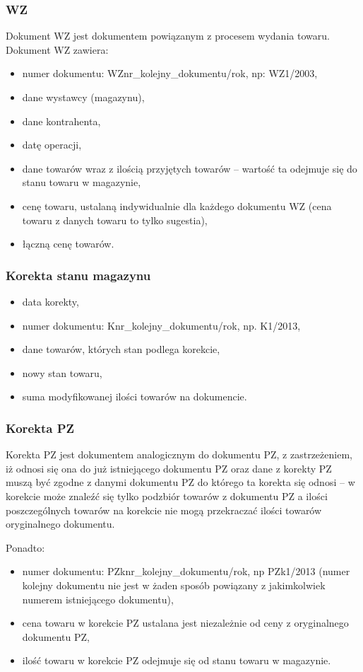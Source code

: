 \subsubsection{WZ}
Dokument WZ jest dokumentem powiązanym z procesem wydania towaru.
Dokument WZ zawiera:
\begin{itemize}
	\item numer dokumentu: WZnr\_kolejny\_dokumentu/rok, np: WZ1/2003,
	\item dane wystawcy (magazynu),
	\item dane kontrahenta,
	\item datę operacji,
	\item dane towarów wraz z ilością przyjętych towarów -- wartość ta odejmuje się do stanu towaru w magazynie,
	\item cenę towaru, ustalaną indywidualnie dla każdego dokumentu WZ (cena towaru z danych towaru to tylko sugestia),
	\item łączną cenę towarów.
\end{itemize}

\subsubsection{Korekta stanu magazynu}
\begin{itemize}
	\item data korekty,
	\item numer dokumentu: Knr\_kolejny\_dokumentu/rok, np. K1/2013,
	\item dane towarów, których stan podlega korekcie,
	\item nowy stan towaru,
	\item suma modyfikowanej ilości towarów na dokumencie.
\end{itemize}

\subsubsection{Korekta PZ}
Korekta PZ jest dokumentem analogicznym do dokumentu PZ, z zastrzeżeniem, iż odnosi się ona do już istniejącego dokumentu PZ oraz dane z korekty PZ muszą być zgodne z danymi dokumentu PZ do którego ta korekta się odnosi -- w korekcie może znaleźć się tylko podzbiór towarów z dokumentu PZ a ilości poszczególnych towarów na korekcie nie mogą przekraczać ilości towarów oryginalnego dokumentu.

Ponadto:
\begin{itemize}
	\item numer dokumentu: PZknr\_kolejny\_dokumentu/rok, np PZk1/2013 (numer kolejny dokumentu nie jest w żaden sposób powiązany z jakimkolwiek numerem istniejącego dokumentu),
	\item cena towaru w korekcie PZ ustalana jest niezależnie od ceny z oryginalnego dokumentu PZ,
	\item ilość towaru w korekcie PZ odejmuje się od stanu towaru w magazynie.
\end{itemize}

